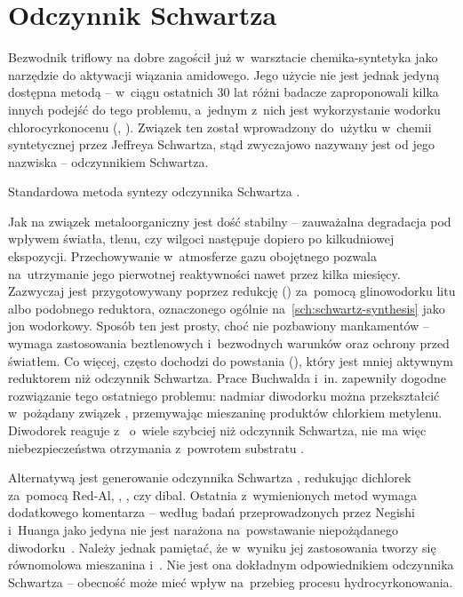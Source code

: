 \section{Odczynnik Schwartza}\label{literature:schwartz}
Bezwodnik triflowy na dobre zagościł już w~warsztacie chemika-syntetyka
  jako narzędzie do aktywacji wiązania amidowego.
Jego użycie nie jest jednak jedyną dostępna metodą \---
  w~ciągu ostatnich 30 lat różni badacze zaproponowali kilka innych podejść do tego problemu,
  a~jednym z~nich jest wykorzystanie wodorku chlorocyrkonocenu (\schwartz{}, ).
Związek ten został wprowadzony do~użytku w~chemii syntetycznej przez Jeffreya Schwartza,
  stąd zwyczajowo nazywany jest od jego nazwiska \--- odczynnikiem Schwartza.

\begin{marginscheme}
  
  \caption{Standardowa metoda syntezy odczynnika Schwartza .}
  \label{sch:schwartz-synthesis}
\end{marginscheme}
Jak na związek metaloorganiczny jest dość stabilny \--- 
  zauważalna degradacja pod wpływem światła, tlenu, czy wilgoci
  następuje dopiero po kilkudniowej ekspozycji.
Przechowywanie w~atmosferze gazu obojętnego pozwala na~utrzymanie
  jego pierwotnej reaktywności nawet przez kilka miesięcy.
Zazwyczaj jest przygotowywany poprzez redukcję \ch{[Cp2ZrCl2]} ()
  za~pomocą glinowodorku litu albo podobnego reduktora,
  oznaczonego ogólnie na~\cref{sch:schwartz-synthesis} jako jon wodorkowy.
Sposób ten jest prosty, choć nie pozbawiony mankamentów \---
  wymaga zastosowania beztlenowych i~bezwodnych warunków oraz ochrony przed światłem.
Co więcej, często dochodzi do powstania \ch{[Cp2ZrH2]} (),
  który jest mniej aktywnym reduktorem niż odczynnik Schwartza.
Prace Buchwalda i~in. zapewniły dogodne rozwiązanie tego ostatniego problemu:
  nadmiar diwodorku  można przekształcić w~pożądany związek ,
  przemywając mieszaninę produktów chlorkiem metylenu.
Diwodorek  reaguje z~ o~wiele szybciej niż odczynnik Schwartza,
  nie ma więc niebezpieczeństwa otrzymania z~powrotem substratu .

Alternatywą jest generowanie odczynnika Schwartza ,
  redukując dichlorek  za~pomocą
  Red-Al, ,
  , czy \gls{dibal}.
Ostatnia z~wymienionych metod wymaga dodatkowego komentarza \---
  według badań przeprowadzonych przez Negishi i~Huanga
  jako jedyna nie jest narażona na~powstawanie niepożądanego diwodorku~.
Należy jednak pamiętać, że w~wyniku jej zastosowania tworzy się równomolowa mieszanina
  \schwartz{} i~.
Nie jest ona dokładnym odpowiednikiem odczynnika Schwartza \--- obecność
   może mieć wpływ na~przebieg procesu hydrocyrkonowania.

